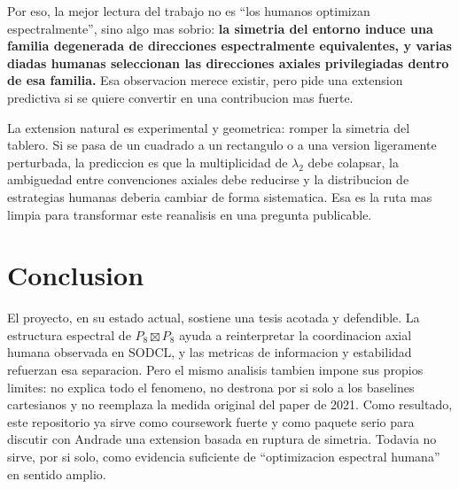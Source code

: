 \documentclass[conference]{IEEEtran}
\begin{document}
Por eso, la mejor lectura del trabajo no es ``los humanos optimizan espectralmente'', sino algo mas sobrio: \textbf{la simetria del entorno induce una familia degenerada de direcciones espectralmente equivalentes, y varias diadas humanas seleccionan las direcciones axiales privilegiadas dentro de esa familia.} Esa observacion merece existir, pero pide una extension predictiva si se quiere convertir en una contribucion mas fuerte.

La extension natural es experimental y geometrica: romper la simetria del tablero. Si se pasa de un cuadrado a un rectangulo o a una version ligeramente perturbada, la prediccion es que la multiplicidad de $\lambda_2$ debe colapsar, la ambiguedad entre convenciones axiales debe reducirse y la distribucion de estrategias humanas deberia cambiar de forma sistematica. Esa es la ruta mas limpia para transformar este reanalisis en una pregunta publicable.

\section{Conclusion}

El proyecto, en su estado actual, sostiene una tesis acotada y defendible. La estructura espectral de $P_8 \boxtimes P_8$ ayuda a reinterpretar la coordinacion axial humana observada en SODCL, y las metricas de informacion y estabilidad refuerzan esa separacion. Pero el mismo analisis tambien impone sus propios limites: no explica todo el fenomeno, no destrona por si solo a los baselines cartesianos y no reemplaza la medida original del paper de 2021. Como resultado, este repositorio ya sirve como coursework fuerte y como paquete serio para discutir con Andrade una extension basada en ruptura de simetria. Todavia no sirve, por si solo, como evidencia suficiente de ``optimizacion espectral humana'' en sentido amplio.
\end{document}
